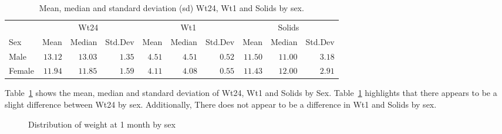 \documentclass[
  letterpaper,
  DIV=11,
  numbers=noendperiod]{scrartcl}
\begin{document}
\begin{longtable}{lrrrrrrrrr}

\caption{\label{tbl-summary}Mean, median and standard deviation (sd)
Wt24, Wt1 and Solids by sex.}

\tabularnewline

\toprule
 & \multicolumn{3}{c}{Wt24} & \multicolumn{3}{c}{Wt1} & \multicolumn{3}{c}{Solids} \\ 
\cmidrule(lr){2-4} \cmidrule(lr){5-7} \cmidrule(lr){8-10}
Sex & Mean & Median & Std.Dev & Mean & Median & Std.Dev & Mean & Median & Std.Dev \\ 
\midrule\addlinespace[2.5pt]
Male & $13.12$ & $13.03$ & $1.35$ & $4.51$ & $4.51$ & $0.52$ & $11.50$ & $11.00$ & $3.18$ \\ 
Female & $11.94$ & $11.85$ & $1.59$ & $4.11$ & $4.08$ & $0.55$ & $11.43$ & $12.00$ & $2.91$ \\ 
\bottomrule

\end{longtable}

Table~\ref{tbl-summary} shows the mean, median and standard deviation of
Wt24, Wt1 and Solids by Sex. Table~\ref{tbl-summary} highlights that
there appears to be a slight difference between Wt24 by sex.
Additionally, There does not appear to be a difference in Wt1 and Solids
by sex.

\begin{figure}


\caption{\label{fig-box-wt1}Distribution of weight at 1 month by sex}

\end{figure}%
\end{document}
